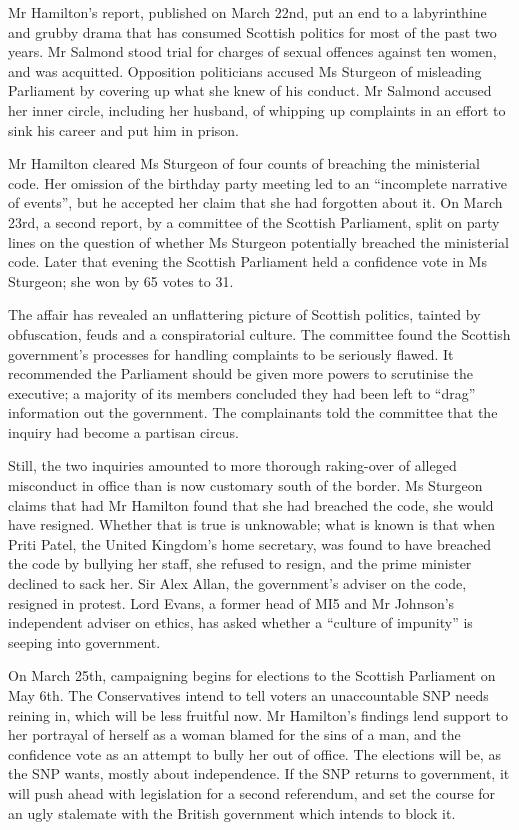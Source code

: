 \documentclass{article}
\begin{document}
Mr Hamilton's report, published on March 22nd, put an end to a labyrinthine and grubby drama that has consumed Scottish politics for most of the past two years. Mr Salmond stood trial for charges of sexual offences against ten women, and was acquitted. Opposition politicians accused Ms Sturgeon of misleading Parliament by covering up what she knew of his conduct. Mr Salmond accused her inner circle, including her husband, of whipping up complaints in an effort to sink his career and put him in prison. 

Mr Hamilton cleared Ms Sturgeon of four counts of breaching the ministerial code. Her omission of the birthday party meeting led to an ``incomplete narrative of events'', but he accepted her claim that she had forgotten about it. On March 23rd, a second report, by a committee of the Scottish Parliament, split on party lines on the question of whether Ms Sturgeon potentially breached the ministerial code. Later that evening the Scottish Parliament held a confidence vote in Ms Sturgeon; she won by 65 votes to 31. 

The affair has revealed an unflattering picture of Scottish politics, tainted by obfuscation, feuds and a conspiratorial culture. The committee found the Scottish government's processes for handling complaints to be seriously flawed. It recommended the Parliament should be given more powers to scrutinise the executive; a majority of its members concluded they had been left to ``drag'' information out the government. The complainants told the committee that the inquiry had become a partisan circus. 

Still, the two inquiries amounted to more thorough raking-over of alleged misconduct in office than is now customary south of the border. Ms Sturgeon claims that had Mr Hamilton found that she had breached the code, she would have resigned. Whether that is true is unknowable; what is known is that when Priti Patel, the United Kingdom's home secretary, was found to have breached the code by bullying her staff, she refused to resign, and the prime minister declined to sack her. Sir Alex Allan, the government's adviser on the code, resigned in protest. Lord Evans, a former head of MI5 and Mr Johnson's independent adviser on ethics, has asked whether a ``culture of impunity'' is seeping into government. 

On March 25th, campaigning begins for elections to the Scottish Parliament on May 6th. The Conservatives intend to tell voters an unaccountable SNP needs reining in, which will be less fruitful now. Mr Hamilton's findings lend support to her portrayal of herself as a woman blamed for the sins of a man, and the confidence vote as an attempt to bully her out of office. The elections will be, as the SNP wants, mostly about independence. If the SNP returns to government, it will push ahead with legislation for a second referendum, and set the course for an ugly stalemate with the British government which intends to block it. 
\end{document}
